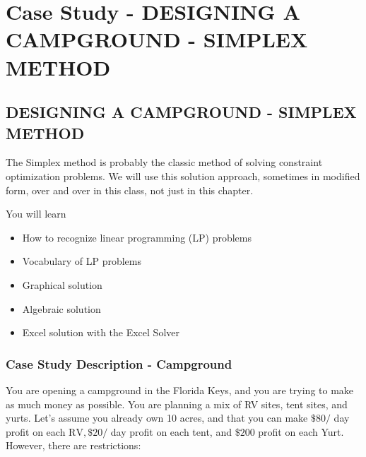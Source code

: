 \chapter{Case Study - DESIGNING A CAMPGROUND - SIMPLEX METHOD}
\section{DESIGNING A CAMPGROUND - SIMPLEX METHOD}
The Simplex method is probably the classic method of solving constraint optimization problems. We will use this solution approach, sometimes in modified form, over and over in this class, not just in this chapter.

\begin{outcome}
You will learn

\begin{itemize}
  \item How to recognize linear programming (LP) problems

  \item Vocabulary of LP problems

  \item Graphical solution

  \item Algebraic solution

  \item Excel solution with the Excel Solver

\end{itemize}
\end{outcome}
\subsection{Case Study Description - Campground}
You are opening a campground in the Florida Keys, and you are trying to make as much money as possible. You are planning a mix of RV sites, tent sites, and yurts. Let's assume you already own 10 acres, and that you can make $\$ 80 /$ day profit on each $\mathrm{RV}, \$ 20 /$ day profit on each tent, and $\$ 200$ profit on each Yurt. However, there are restrictions:

